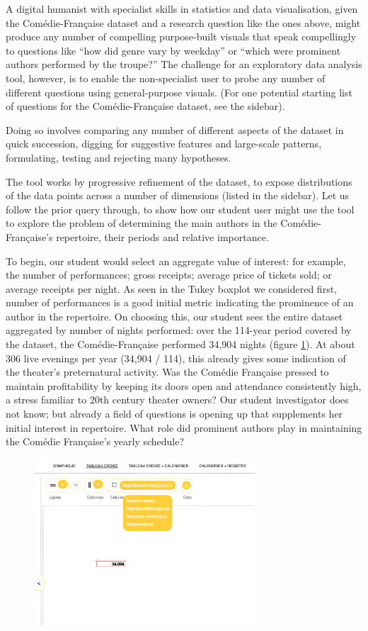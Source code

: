 \documentclass[	DIV=calc,%
							paper=a4,%
							fontsize=11pt,%
							twocolumn]{scrartcl}	 					%
\begin{document}
A digital humanist with specialist skills in statistics and data visualisation, given the Comédie-Française dataset and a research question like the ones above, might produce any number of compelling purpose-built visuals that speak compellingly to questions like ``how did genre vary by weekday'' or ``which were prominent authors performed by the troupe?''  The challenge for an exploratory data analysis tool, however, is to enable the non-specialist user to probe any number of different questions using general-purpose visuals.  (For one potential starting list of questions for the Comédie-Française dataset, see the sidebar).

Doing so involves comparing any number of different aspects of the dataset in quick succession, digging for suggestive features and large-scale patterns, formulating, testing and rejecting many hypotheses.

The tool works by progressive refinement of the dataset, to expose distributions of the data points across a number of dimensions (listed in the sidebar).  Let us follow the prior query through, to show how our student user might use the tool to explore the problem of determining the main authors in the Comédie-Française’s repertoire, their periods and relative importance.

To begin, our student would select an aggregate value of interest: for example, the number of performances; gross receipts; average price of tickets sold; or average receipts per night.  As seen in the Tukey boxplot we considered first, number of performances is a good initial metric indicating the prominence of an author in the repertoire.  On choosing this, our student sees the entire dataset aggregated by number of nights performed: over the 114-year period covered by the dataset, the Comédie-Française performed 34,904 nights (figure \ref{fig:opening}).  At about 306 live evenings per year (34,904 / 114), this already gives some indication of the theater’s preternatural activity.  Was the Comédie Française pressed to maintain profitability by keeping its doors open and attendance consistently high, a stress familiar to 20th century theater owners?  Our student investigator does not know; but already a field of questions is opening up that supplements her initial interest in repertoire.  What role did prominent authors play in maintaining the Comédie Française’s yearly schedule?

\begin{figure}
  \centering
	\includegraphics[width=3.25in]{steps/opening.png}
	\caption{}
	\label{fig:opening}
\end{figure}
\end{document}
